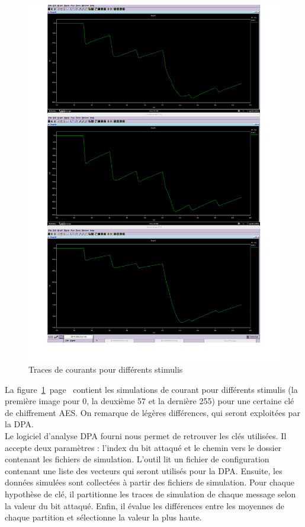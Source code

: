 \begin{figure}[h!]
    \centering
    \includegraphics[width=\textwidth]{data/courantsImage}
    \caption{Traces de courants pour différents stimulis}
    \label{fig:courants}
\end{figure}

La figure~\ref{fig:courants}~page~\pageref{fig:courants}
 contient les simulations de courant pour différents stimulis
(la première image pour 0, la deuxième 57 et la dernière 255) pour une certaine
clé de chiffrement AES. On remarque de légères différences, qui seront
exploitées par la DPA.\\

Le logiciel d'analyse DPA fourni nous permet de retrouver les clés utilisées.
Il accepte deux paramètres : l'index du bit attaqué et le chemin vers le
dossier contenant les fichiers de simulation.
L'outil lit un fichier de configuration contenant une liste des vecteurs qui
seront utilisés pour la DPA. Ensuite, les données simulées sont collectées à
partir des fichiers de simulation. Pour chaque hypothèse de clé, il partitionne
les traces de simulation de chaque message selon la valeur du bit attaqué.
Enfin, il évalue les différences entre les moyennes de chaque partition et
sélectionne la valeur la plus haute.


